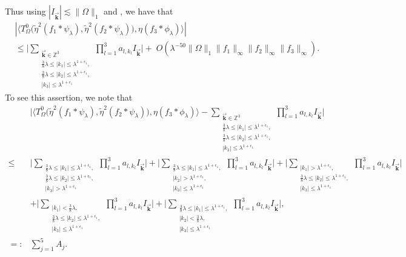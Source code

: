 \documentclass[a4paper,reqno]{amsart}
\newcommand{\Z}{{\mathbb Z}}
\theoremstyle{definition}
\numberwithin{equation}{section}
\begin{document}
Thus using $|I_{\vec{\mathbf{k}}}|\lesssim\|\Omega\|_1$ and , we have that
\begin{align}\label{reducedoperator}
	&\left|\langle T^0_\Omega\Big(\widetilde\eta^2(f_1*\psi_\lambda),\widetilde\eta^2(f_2*\psi_\lambda)\Big),\eta(f_3*\phi_{\lambda})\rangle\right|\nonumber\\
	&\leq\Bigg|\sum_{\substack{\vec{\mathbf{k}}\in\Z^{3}\\\frac{3}{8}\lambda\leq|k_1|\leq\lambda^{1+\epsilon_1},\\\frac{3}{8}\lambda\leq|k_2|\leq\lambda^{1+\epsilon_1},\\|k_3|\leq\lambda^{1+\epsilon_1}}}\prod_{l=1}^{3}a_{l,k_l}I_{\vec{\mathbf{k}}}\Bigg|	+\;O(\lambda^{-50}\|\Omega\|_1\|f_1\|_\infty\|f_2\|_\infty\|f_3\|_\infty).
\end{align}
To see this assertion, we note that
\begin{align*}
	&\Bigg|\langle T^0_\Omega\Big(\widetilde\eta^2(f_1*\psi_\lambda),\widetilde\eta^2(f_2*\psi_\lambda)\Big),\eta(f_3*\phi_{\lambda})\rangle-\sum_{\substack{\vec{\mathbf{k}}\in\Z^{3}\\\frac{3}{8}\lambda\leq|k_1|\leq\lambda^{1+\epsilon_1},\\\frac{3}{8}\lambda\leq|k_2|\leq\lambda^{1+\epsilon_1},\\|k_3|\leq\lambda^{1+\epsilon_1}}}\prod_{l=1}^{3}a_{l,k_l}I_{\vec{\mathbf{k}}}\Bigg|\\
	\leq&\Bigg|\sum_{\substack{\frac{3}{8}\lambda\leq|k_1|\leq\lambda^{1+\epsilon_1},\\\frac{3}{8}\lambda\leq|k_2|\leq\lambda^{1+\epsilon_1},\\|k_3|>\lambda^{1+\epsilon_1}}}\prod_{l=1}^{3}a_{l,k_l}I_{\vec{\mathbf{k}}}\Bigg|+\Bigg|\sum_{\substack{\frac{3}{8}\lambda\leq|k_1|\leq\lambda^{1+\epsilon_1},\\|k_2|>\lambda^{1+\epsilon_1},\\|k_3|\leq\lambda^{1+\epsilon_1}}}\prod_{l=1}^{3}a_{l,k_l}I_{\vec{\mathbf{k}}}\Bigg|+\Bigg|\sum_{\substack{|k_1|>\lambda^{1+\epsilon_1},\\\frac{3}{8}\lambda\leq|k_2|\leq\lambda^{1+\epsilon_1},\\|k_3|\leq\lambda^{1+\epsilon_1}}}\prod_{l=1}^{3}a_{l,k_l}I_{\vec{\mathbf{k}}}\Bigg|\\
	&+\Bigg|\sum_{\substack{|k_1|<\frac{3}{8}\lambda,\\\frac{3}{8}\lambda\leq|k_2|\leq\lambda^{1+\epsilon_1},\\|k_3|\leq\lambda^{1+\epsilon_1}}}\prod_{l=1}^{3}a_{l,k_l}I_{\vec{\mathbf{k}}}\Bigg|+\Bigg|\sum_{\substack{\frac{3}{8}\lambda\leq|k_1|\leq\lambda^{1+\epsilon_1},\\|k_2|<\frac{3}{8}\lambda,\\|k_3|\leq\lambda^{1+\epsilon_1}}}\prod_{l=1}^{3}a_{l,k_l}I_{\vec{\mathbf{k}}}\Bigg|,\\
	=:&\sum_{j=1}^5 A_j.
\end{align*}
\end{document}
